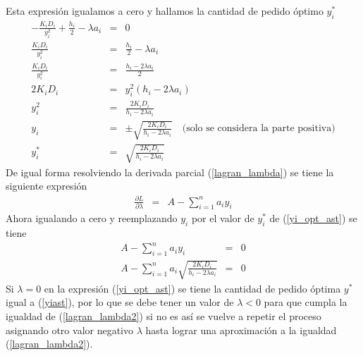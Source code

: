 Esta expresión igualamos a cero y hallamos la cantidad de pedido óptimo ${y}_{i}^{*}$
\begin{eqnarray}
	\label{yi_opt_ast}
	- \frac{{K}_{i} {D}_{i}}{{y}_{i}^2} + \frac{{h}_{i}}{2} - \lambda {a}_{i} &=& 0 \nonumber \\
	\frac{{K}_{i} {D}_{i}}{{y}_{i}^2} &=& \frac{{h}_{i}}{2} - \lambda {a}_{i} \nonumber \\
	\frac{{K}_{i} {D}_{i}}{{y}_{i}^2} &=& \frac{{h}_{i} - 2 \lambda {a}_{i}}{2} \nonumber \\
	2 {K}_{i} {D}_{i} &=& {y}_{i}^{2} ({h}_{i} - 2 \lambda {a}_{i}) \nonumber \\
	{y}_{i}^{2} &=& \frac{2 {K}_{i} {D}_{i}}{{h}_{i} - 2 \lambda {a}_{i}} \nonumber \\
	{y}_{i} &=& \pm \sqrt{\frac{2 {K}_{i} {D}_{i}}{{h}_{i} - 2 \lambda {a}_{i}}} \quad \text{(solo se considera la parte positiva)} \nonumber \\
	{y}_{i}^{*} &=& \sqrt{\frac{2 {K}_{i} {D}_{i}}{{h}_{i} - 2 \lambda {a}_{i}}}
\end{eqnarray}
De igual forma resolviendo la derivada parcial (\ref{lagran_lambda}) se tiene la siguiente expresión
\begin{eqnarray}
	\frac{\partial L}{\partial \lambda} &=& A - \sum\limits_{i = 1}^{n} {a}_{i} {y}_{i} \nonumber
\end{eqnarray}
Ahora igualando a cero y reemplazando ${y}_{i}$ por el valor de ${y}_{i}^{*}$ de (\ref{yi_opt_ast}) se tiene
\begin{eqnarray}
	\label{lagran_lambda2}
	A - \sum\limits_{i = 1}^{n} {a}_{i} {y}_{i} &=& 0 \nonumber \\
	A - \sum\limits_{i = 1}^{n} {a}_{i} \sqrt{\frac{2 {K}_{i} {D}_{i}}{{h}_{i} - 2 \lambda {a}_{i}}} &=& 0 
\end{eqnarray}
Si $\lambda = 0$ en la expresión (\ref{yi_opt_ast}) se tiene la cantidad de pedido óptima $y^*$ igual a (\ref{yiast}), por lo que se debe tener un valor de $\lambda < 0$ para que cumpla la igualdad de (\ref{lagran_lambda2}) si no es así se vuelve a repetir el proceso asignando otro valor negativo $\lambda$ hasta lograr una aproximación a la igualdad (\ref{lagran_lambda2}).


